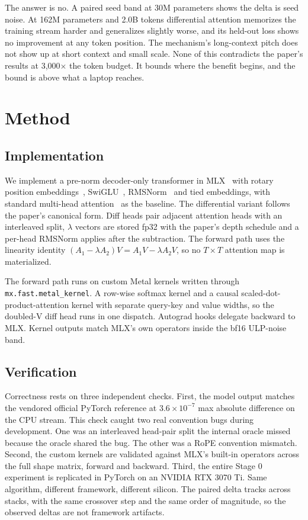\documentclass[11pt]{article}
\begin{document}
The answer is no. A paired seed band at 30M parameters shows the
delta is seed noise. At 162M parameters and 2.0B tokens differential
attention memorizes the training stream harder and generalizes
slightly worse, and its held-out loss shows no improvement at any
token position. The mechanism's long-context pitch does not show up at
short context and small scale. None of this contradicts the paper's
results at 3,000$\times$ the token budget. It bounds where the benefit
begins, and the bound is above what a laptop reaches.

\section{Method}

\subsection{Implementation}
We implement a pre-norm decoder-only transformer in
MLX~\cite{mlx2023} with rotary position embeddings~\cite{su2024roformer},
SwiGLU~\cite{shazeer2020glu}, RMSNorm~\cite{zhang2019rmsnorm} and tied
embeddings, with standard multi-head attention~\cite{vaswani2017attention}
as the baseline. The differential variant follows the paper's canonical
form. Diff heads pair adjacent attention heads with an interleaved
split, $\lambda$ vectors are stored fp32 with the paper's depth
schedule and a per-head RMSNorm applies after the subtraction. The
forward path uses the linearity identity
$(A_1 - \lambda A_2)V = A_1 V - \lambda A_2 V$, so no $T \times T$
attention map is materialized.

The forward path runs on custom Metal kernels written through
\texttt{mx.fast.metal\_kernel}. A row-wise softmax kernel and a causal
scaled-dot-product-attention kernel with separate query-key and value
widths, so the doubled-V diff head runs in one dispatch. Autograd hooks
delegate backward to MLX. Kernel outputs match MLX's own operators
inside the bf16 ULP-noise band.

\subsection{Verification}
Correctness rests on three independent checks. First, the model output
matches the vendored official PyTorch reference at $3.6 \times 10^{-7}$
max absolute difference on the CPU stream. This check caught two real
convention bugs during development. One was an interleaved head-pair 
split the internal oracle missed because the oracle shared the bug. 
The other was a RoPE convention mismatch. Second, the custom kernels 
are validated against MLX's built-in operators across the full shape matrix,
forward and backward. Third, the entire Stage 0 experiment is replicated 
in PyTorch on an NVIDIA RTX 3070 Ti. Same algorithm, different framework,
different silicon. The paired delta tracks across stacks, with the same
crossover step and the same order of magnitude, so the observed deltas
are not framework artifacts.
\end{document}

